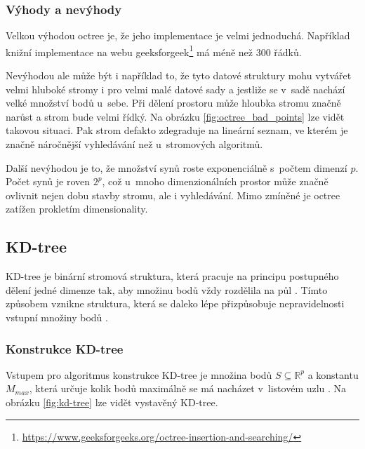 \subsubsection{Výhody a nevýhody}
Velkou výhodou octree je, že jeho implementace je velmi jednoduchá. Například knižní implementace na webu geeksforgeek\footnote{\url{https://www.geeksforgeeks.org/octree-insertion-and-searching/}} má méně než 300 řádků.

Nevýhodou ale může být i například to, že tyto datové struktury mohu vytvářet velmi hluboké stromy i pro velmi malé datové sady a jestliže se v~sadě nachází velké množství bodů u~sebe. Při dělení prostoru může hloubka stromu značně narůst a strom bude velmi řídký. Na obrázku \ref{fig:octree_bad_points} lze vidět takovou situaci. Pak strom defakto zdegraduje na lineární seznam, ve kterém je značně náročnější vyhledávání než u~stromových algoritmů. 

Další nevýhodou je to, že množství synů roste exponenciálně s~počtem dimenzí $p$. Počet synů je roven $2^p$, což u~mnoho dimenzionálních prostor může značně ovlivnit nejen dobu stavby stromu, ale i vyhledávání.
Mimo zmíněné je octree zatížen prokletím dimensionality.









\subsection*{KD-tree}
KD-tree je binární stromová struktura, která pracuje na principu postupného dělení jedné dimenze tak, aby množinu bodů vždy rozdělila na půl \cite{moore1991kdtrees}. Tímto způsobem vznikne struktura, která se daleko lépe přizpůsobuje nepravidelnosti vstupní množiny bodů \cite{kdimensiontree}.

\subsubsection{Konstrukce KD-tree}
Vstupem pro algoritmus konstrukce KD-tree je množina bodů $S \subseteq \mathbb{R}^p$ a konstantu $M_{max}$, která určuje kolik bodů maximálně se má nacházet v~listovém uzlu \cite{moore1991kdtrees}. Na obrázku \ref{fig:kd-tree} lze vidět vystavěný KD-tree. 


